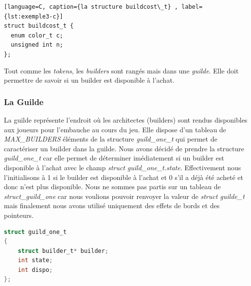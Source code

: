 \documentclass{article}
\begin{document}
    
\begin{tcolorbox}[colback=gray!10,colframe=white!75!black]

\begin{lstlisting}[language=C, caption={la structure buildcost\_t} , label={lst:exemple3-c}]
struct buildcost_t {
  enum color_t c;       
  unsigned int n;       
};
\end{lstlisting}
\end{tcolorbox}

\hspace{1em} Tout comme les \emph{tokens}, les \emph{builders} sont rangés mais dans une \emph{guilde}. Elle doit permettre de savoir si un builder est disponible à l'achat. 

\subsubsection{La Guilde}
\vspace{1em}
\hspace{1em}
La guilde représente l'endroit où les architectes (builders) sont rendus disponibles aux joueurs pour l'embauche au cours du jeu. Elle dispose d'un tableau de \emph{MAX\_BUILDERS} éléments de la structure \emph{guild\_one\_t} qui permet de caractériser un builder dans la guilde. Nous avons décidé de prendre la structure \emph{guild\_one\_t} car elle permet de déterminer imédiatement si un builder est disponible à l'achat avec le champ \emph{struct guild\_one\_t.state}. Effectivement nous l'initialisons à 1 si le builder est disponible à l'achat et 0 s'il a déjà été acheté et donc n'est plus disponible. Nous ne sommes pas partis sur un tableau de \emph{struct\_guild\_one} car nous voulions pouvoir renvoyer la valeur de \emph{struct guilde\_t} mais finalement nous avons utilisé uniquement des effets de bords et des pointeurs. 
\vspace{1em}

\begin{tcolorbox}[colback=gray!10,colframe=white!75!black]

\begin{lstlisting}[language=C, caption={La structure \texttt{guild\_one\_t}}, label={lst:exemple4-c}]
struct guild_one_t 
{
    struct builder_t* builder;
    int state;
    int dispo;
};
\end{lstlisting}
\end{tcolorbox}
\end{document}
